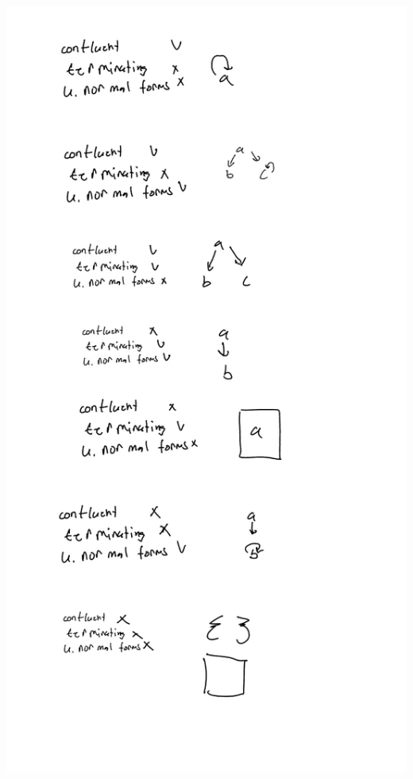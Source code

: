 \documentclass{article}
\theoremstyle{theorem}
\theoremstyle{definition}
\theoremstyle{remark}
\begin{document}
\begin{center}
\includegraphics[scale=0.2]{hw7.2.jpg}
\end{center}
\end{document}
